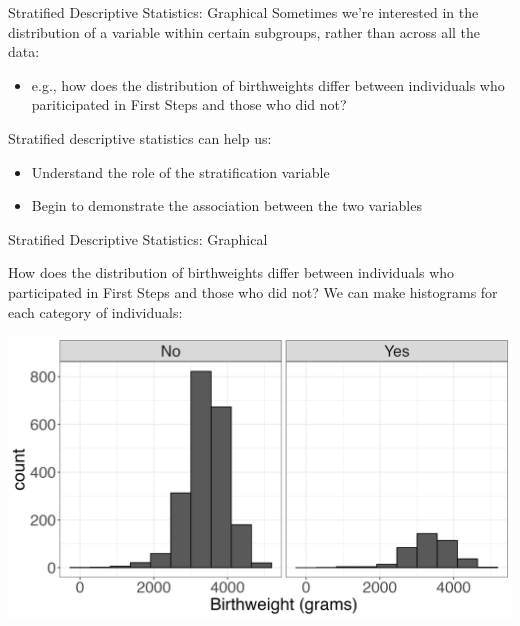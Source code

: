 \documentclass[10pt,t]{beamer}
\begin{document}
\begin{frame}{Stratified Descriptive Statistics: Graphical}
Sometimes we're interested in the distribution of a variable within certain subgroups, rather than across all the data:

\vspace{0.3cm}

\begin{itemize}
	\item e.g., how does the distribution of birthweights differ between individuals who pariticipated in First Steps and those who did not?
\end{itemize}

\vspace{0.3cm}

Stratified descriptive statistics can help us:

\vspace{0.3cm}

\begin{itemize}
	\item Understand the role of the stratification variable
	\item Begin to demonstrate the association between the two variables
\end{itemize}

\end{frame}

\begin{frame}{Stratified Descriptive Statistics: Graphical}

How does the distribution of birthweights differ between individuals who participated in First Steps and those who did not? We can make histograms for each category of individuals:

\vspace{0.3cm}

\centering \includegraphics[scale=0.3]{fs_hist_firstep.png}

\end{frame}
\end{document}
